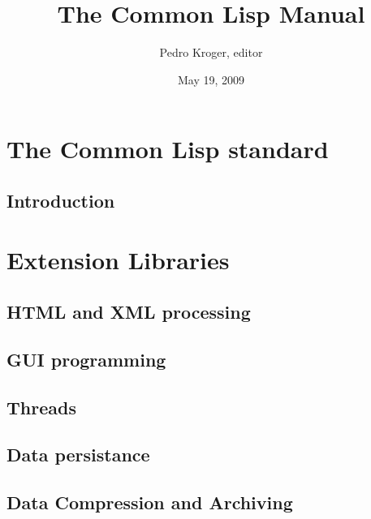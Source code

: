 \documentclass[10pt,english]{book}
\title{The Common Lisp Manual}
\author{Pedro Kroger, editor}
\date{May 19, 2009}
\begin{document}
\frontmatter

\maketitle
\tableofcontents

\mainmatter

\part{The Common Lisp standard}
\label{part:common-lisp-standard}

\chapter{Introduction}























\part{Extension Libraries}
\label{part:libraries}

\chapter{HTML and XML processing}

\chapter{GUI programming}

\chapter{Threads}

\chapter{Data persistance}

\chapter{Data Compression and Archiving}
\end{document}
